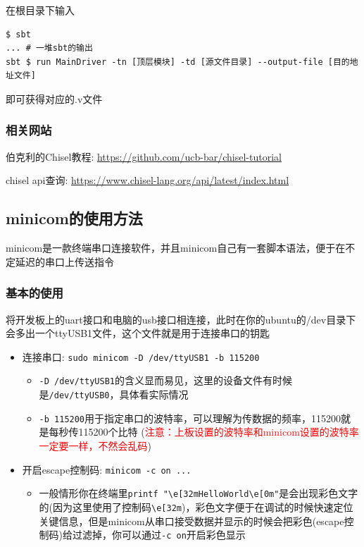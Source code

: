 \documentclass[lang=cn,11pt,a4paper]{elegantpaper}
\begin{document}
在根目录下输入
\begin{lstlisting}
$ sbt
... # 一堆sbt的输出
sbt $ run MainDriver -tn [顶层模块] -td [源文件目录] --output-file [目的地址文件]
\end{lstlisting}
即可获得对应的.v文件
\subsubsection{相关网站}
伯克利的Chisel教程: \url{https://github.com/ucb-bar/chisel-tutorial}

chisel api查询: \url{https://www.chisel-lang.org/api/latest/index.html}

\subsection{minicom的使用方法}

minicom是一款终端串口连接软件，并且minicom自己有一套脚本语法，便于在不定延迟的串口上传送指令

\subsubsection{基本的使用}
将开发板上的uart接口和电脑的usb接口相连接，此时在你的ubuntu的/dev目录下会多出一个ttyUSB1文件，这个文件就是用于连接串口的钥匙
\begin{itemize}
\item 连接串口: \lstinline!sudo minicom -D /dev/ttyUSB1 -b 115200!
\begin{itemize}
\item \lstinline!-D /dev/ttyUSB1!的含义显而易见，这里的设备文件有时候是\lstinline!/dev/ttyUSB0!，具体看实际情况
\item \lstinline!-b 115200!用于指定串口的波特率，可以理解为传数据的频率，115200就是每秒传115200个比特 (\textcolor{red}{注意：上板设置的波特率和minicom设置的波特率一定要一样，不然会乱码})
\end{itemize}
\item 开启escape控制码: \lstinline!minicom -c on ...!
\begin{itemize}
\item 一般情形你在终端里\lstinline!printf "\e[32mHelloWorld\e[0m"!是会出现彩色文字的(因为这里使用了控制码\lstinline!\e[32m!)，彩色文字便于在调试的时候快速定位关键信息，但是minicom从串口接受数据并显示的时候会把彩色(escape控制码)给过滤掉，你可以通过\lstinline!-c on!开启彩色显示
\end{itemize}
\end{itemize}
\end{document}
